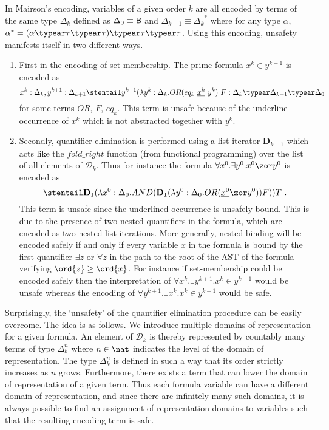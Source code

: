 In Mairson's encoding, variables of a given order $k$ are all
encoded by terms of the same type $\Delta_k$ defined as $\Delta_0
\equiv \mathsf{B}$ and $\Delta_{k+1} \equiv {\Delta_k}^*$ where for
any type $\alpha$, $\alpha^* = (\alpha \typear \tau \typear
\tau)\typear \tau \typear \tau$. Using this encoding, unsafety
manifests itself in two different ways.
\begin{enumerate}[1.]
  \item
        First in the encoding of set membership. The prime formula $x^k \in y^{k+1}$ is encoded as \begin{equation} x^k : \Delta_k, y^{k+1}:\Delta_{k+1} \stentail y^{k+1} (\lambda y^k : \Delta_k . OR (eq_k~\underline{x^k}~y^k)~F : \Delta_k \typear \Delta_{k+1} \typear \Delta_0 \label{eqn:setmembership}\end{equation}
for some terms $OR$, $F$, $eq_k$.
This term is unsafe because of the underline occurrence of $x^k$ which is not abstracted together with $y^k$.

\item Secondly, quantifier elimination is performed using a list iterator $\mathbf{D}_{k+1}$ which acts like the $fold\_right$ function (from functional programming) over the list of all elements of $\mathcal{D}_k$.
Thus for instance the formula $\forall x^0 . \exists y^0 . x^0 \zor y^0$
is encoded as $$\stentail \mathbf{D}_1 (\lambda x^0:\Delta_0. AND (\mathbf{D}_1 (\lambda y^0:\Delta_0. OR (\underline{x^0} \zor y^0)) F)) T \ .$$
This term is unsafe since the underlined occurrence is unsafely bound. This is due to the presence of two nested quantifiers in the formula, which are encoded as two nested list iterations. More generally, nested binding will be encoded safely if and only if every variable $x$ in the formula is bound by the first quantifier $\exists z$ or $\forall z$ in the path to the root of the AST of the formula verifying $\ord{z} \geq \ord{x}$. For instance if set-membership could be encoded safely then the interpretation of $\forall x^k . \exists y^{k+1} . x^k \in y^{k+1}$ would be unsafe whereas the encoding of $\forall y^{k+1} . \exists x^k . x^k \in y^{k+1}$ would be safe.
\end{enumerate}

Surprisingly, the `unsafety' of the quantifier elimination procedure can be easily overcome. The idea is as follows. We introduce multiple domains of representation for a given formula. An element of $\mathcal{D}_k$ is thereby represented by countably many terms of type $\Delta_k^n$ where $n\in\nat$ indicates the level of the domain of representation. The type $\Delta_k^n$ is defined in such a way that its order strictly increases as $n$ grows. Furthermore, there exists a term that can lower the domain of representation of a given term. Thus each formula variable can have a different domain of representation, and since there are infinitely many such domains, it is always possible to find an assignment of representation domains to variables such that the resulting encoding term is safe.

